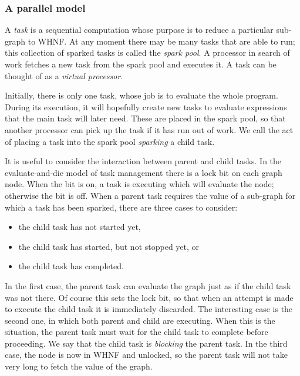 \subsubsection{A parallel model}

A {\em task\/} is a sequential computation whose purpose is
to reduce a particular sub-graph to WHNF. At any moment there may be
many tasks that are able to run; this collection of sparked tasks is
called the {\em spark pool}. A processor in search
of work fetches a new task from the spark pool and executes it. A task
can be thought of as a {\em virtual processor}.

Initially, there is only one task, whose job is to evaluate the whole
program.  During its execution, it will hopefully create new tasks to
evaluate expressions that the main task will later need. These are
placed in the spark pool, so that another processor can pick up the
task if it has run out of work. We call the act of placing a task into
the spark pool {\em sparking\/} a child
task.

It is useful to consider the interaction between parent and child
tasks. In the {evaluate-and-die model} of task management there is a lock bit on each graph
node. When the bit is on, a task is executing which will evaluate the
node; otherwise the bit is off. When a parent task requires the value
of a sub-graph for which a task has been sparked, there are three
cases to consider:
\begin{itemize}
\item the child task has not started yet,
\item the child task has started, but not stopped yet, or
\item the child task has completed.
\end{itemize}
In the first case, the parent task can evaluate the graph just as if
the child task was not there. Of course this sets the lock bit, so
that when an attempt is made to execute the child task it is
immediately discarded. The interesting case is the second one, in
which both parent and child are executing. When this is the situation,
the parent task must wait for the child task to complete before
proceeding. We say that the child task is {\em
blocking\/} the parent task.  In the
third case, the node is now in WHNF and unlocked, so the parent task
will not take very long to fetch the value of the graph.

